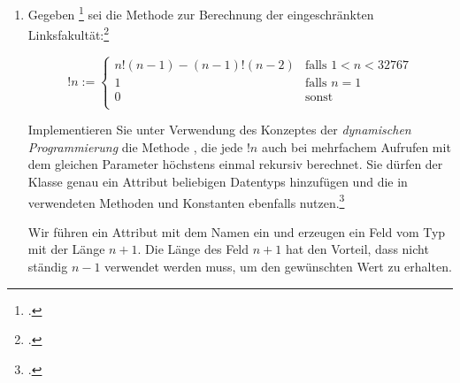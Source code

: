 \documentclass{bschlangaul-aufgabe}
\begin{document}

\let\m=\bInduktionMarkierung
\let\e=\bInduktionErklaerung
\def\lf#1{\text{lfLong}(#1)}
\def\sk#1{\sum^{#1}_{k=0}k!}

\begin{enumerate}


\item Gegeben
\footcite[Seite 2-3]{examen:66115:2014:03} sei die Methode  zur
Berechnung der eingeschränkten Linksfakultät:\footcite[Seite
25]{aud:fs:1}

\begin{equation*}
!n :=
\begin{cases}
n !(n - 1) - (n - 1) !(n - 2) &
\text{falls } 1 < n < 32767 \\

1 &
\text{falls } n = 1 \\

0 &
\text{sonst } \\
\end{cases}
\end{equation*}


Implementieren Sie unter Verwendung des Konzeptes der \emph{dynamischen
Programmierung} die Methode , die
jede $!n$ auch bei mehrfachem Aufrufen mit dem gleichen Parameter
höchstens einmal rekursiv berechnet. Sie dürfen der Klasse
 genau ein Attribut beliebigen Datentyps
hinzufügen und die in  verwendeten Methoden und
Konstanten ebenfalls nutzen.\footcite[Aufgabe 5]{aud:pu:1}

\begin{bAntwort}
Wir führen ein Attribut mit dem Namen  ein und
erzeugen ein Feld vom Typ  mit der Länge $n + 1$.
Die Länge des Feld $n + 1$ hat den Vorteil, dass nicht ständig $n - 1$
verwendet werden muss, um den gewünschten Wert zu erhalten.


\end{bAntwort}
\end{enumerate}
\end{document}
